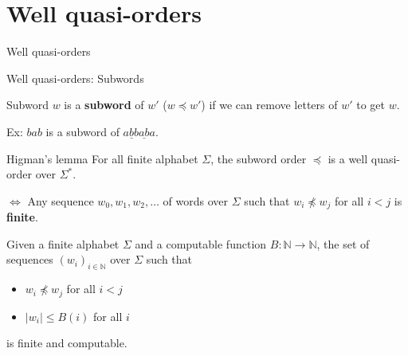 \documentclass{beamer}
\begin{document}
\section{Well quasi-orders}

\begin{frame}
	\tableofcontents[currentsection]
\end{frame}


\begin{frame}{Well quasi-orders}
		 
	
		
		



%	
	
\end{frame}


\begin{frame}{Well quasi-orders: Subwords}
	
	\begin{block}{Subword}
		$w$ is a \textbf{subword} of $w'$ ($w \preceq w'$) if we can remove letters of $w'$ to get $w$.
	\end{block}
	
	Ex: $bab$ is a subword of $a\underline{b}b\underline{ab}a$.
	
	\pause
	\begin{block}{Higman's lemma}
		For all finite alphabet $\Sigma$, the subword order $\preceq$ is a well quasi-order over $\Sigma^*$.
	\end{block}

	\pause
	$\Leftrightarrow$ Any sequence $w_0, w_1, w_2, \ldots$ of words over $\Sigma$ such that $w_i \npreceq w_j$ for all $i<j$ is \textbf{finite}.
	\vspace{-0.2cm}
	
	\pause
	\begin{framed}
	Given a finite alphabet $\Sigma$ and a computable function $B : \mathbb{N} \to \mathbb{N}$, the set of sequences $(w_i)_{i \in \mathbb{N}}$ over $\Sigma$ such that
	\begin{itemize}
		\item $w_i \npreceq w_j$ for all $i<j$ 
		\item $|w_i| \leq B(i)$ for all $i$
	\end{itemize}
is finite and computable.
\end{framed}

\end{frame}
\end{document}
